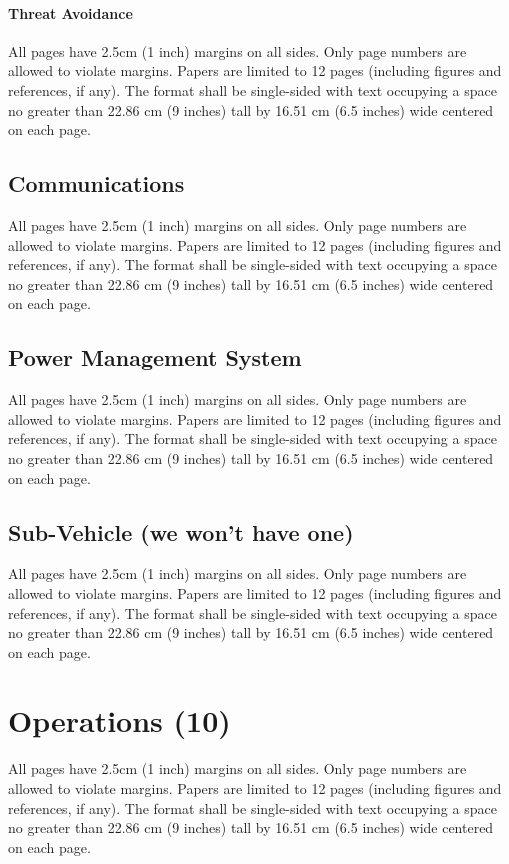 \documentclass[12pt, letterpaper]{article}
\begin{document}
\paragraph{Threat Avoidance}
All pages have 2.5cm (1 inch) margins on all sides. Only page numbers are allowed to violate margins. Papers are limited to 12 pages (including figures and references, if any). The format shall be single-sided with text occupying a space no greater than 22.86 cm (9 inches) tall by 16.51 cm (6.5 inches) wide centered on each page.

\subsection{Communications}
All pages have 2.5cm (1 inch) margins on all sides. Only page numbers are allowed to violate margins. Papers are limited to 12 pages (including figures and references, if any). The format shall be single-sided with text occupying a space no greater than 22.86 cm (9 inches) tall by 16.51 cm (6.5 inches) wide centered on each page.

\subsection{Power Management System}
All pages have 2.5cm (1 inch) margins on all sides. Only page numbers are allowed to violate margins. Papers are limited to 12 pages (including figures and references, if any). The format shall be single-sided with text occupying a space no greater than 22.86 cm (9 inches) tall by 16.51 cm (6.5 inches) wide centered on each page.

\subsection{Sub-Vehicle (we won't have one)}
All pages have 2.5cm (1 inch) margins on all sides. Only page numbers are allowed to violate margins. Papers are limited to 12 pages (including figures and references, if any). The format shall be single-sided with text occupying a space no greater than 22.86 cm (9 inches) tall by 16.51 cm (6.5 inches) wide centered on each page.


\section{Operations (10)}
All pages have 2.5cm (1 inch) margins on all sides. Only page numbers are allowed to violate margins. Papers are limited to 12 pages (including figures and references, if any). The format shall be single-sided with text occupying a space no greater than 22.86 cm (9 inches) tall by 16.51 cm (6.5 inches) wide centered on each page.
\end{document}
